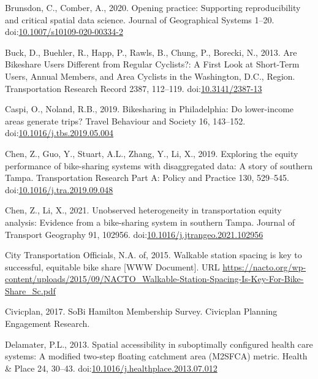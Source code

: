\documentclass[]{elsarticle} %
\begin{document}
\leavevmode\hypertarget{ref-brunsdon2020opening}{}%
Brunsdon, C., Comber, A., 2020. Opening practice: Supporting
reproducibility and critical spatial data science. Journal of
Geographical Systems 1--20.
doi:\href{https://doi.org/10.1007/s10109-020-00334-2}{10.1007/s10109-020-00334-2}

\leavevmode\hypertarget{ref-buckAreBikeshareUsers2013}{}%
Buck, D., Buehler, R., Happ, P., Rawls, B., Chung, P., Borecki, N.,
2013. Are Bikeshare Users Different from Regular Cyclists?: A First Look
at Short-Term Users, Annual Members, and Area Cyclists in the
Washington, D.C., Region. Transportation Research Record 2387, 112--119.
doi:\href{https://doi.org/10.3141/2387-13}{10.3141/2387-13}

\leavevmode\hypertarget{ref-caspiBikesharingPhiladelphiaLowerincome2019}{}%
Caspi, O., Noland, R.B., 2019. Bikesharing in Philadelphia: Do
lower-income areas generate trips? Travel Behaviour and Society 16,
143--152.
doi:\href{https://doi.org/10.1016/j.tbs.2019.05.004}{10.1016/j.tbs.2019.05.004}

\leavevmode\hypertarget{ref-chenExploringEquityPerformance2019}{}%
Chen, Z., Guo, Y., Stuart, A.L., Zhang, Y., Li, X., 2019. Exploring the
equity performance of bike-sharing systems with disaggregated data: A
story of southern Tampa. Transportation Research Part A: Policy and
Practice 130, 529--545.
doi:\href{https://doi.org/10.1016/j.tra.2019.09.048}{10.1016/j.tra.2019.09.048}

\leavevmode\hypertarget{ref-chenUnobservedHeterogeneityTransportation2021}{}%
Chen, Z., Li, X., 2021. Unobserved heterogeneity in transportation
equity analysis: Evidence from a bike-sharing system in southern Tampa.
Journal of Transport Geography 91, 102956.
doi:\href{https://doi.org/10.1016/j.jtrangeo.2021.102956}{10.1016/j.jtrangeo.2021.102956}

\leavevmode\hypertarget{ref-nactowalkingstation2015}{}%
City Transportation Officials, N.A. of, 2015. Walkable station spacing
is key to successful, equitable bike share {[}WWW Document{]}. URL
\url{https://nacto.org/wp-content/uploads/2015/09/NACTO_Walkable-Station-Spacing-Is-Key-For-Bike-Share_Sc.pdf}

\leavevmode\hypertarget{ref-civicplanSoBiHamiltonMembership2017}{}%
Civicplan, 2017. SoBi Hamilton Membership Survey. Civicplan \textbar{}
Planning Engagement Research.

\leavevmode\hypertarget{ref-delamaterSpatialAccessibilitySuboptimally2013}{}%
Delamater, P.L., 2013. Spatial accessibility in suboptimally configured
health care systems: A modified two-step floating catchment area
(M2SFCA) metric. Health \& Place 24, 30--43.
doi:\href{https://doi.org/10.1016/j.healthplace.2013.07.012}{10.1016/j.healthplace.2013.07.012}
\end{document}
